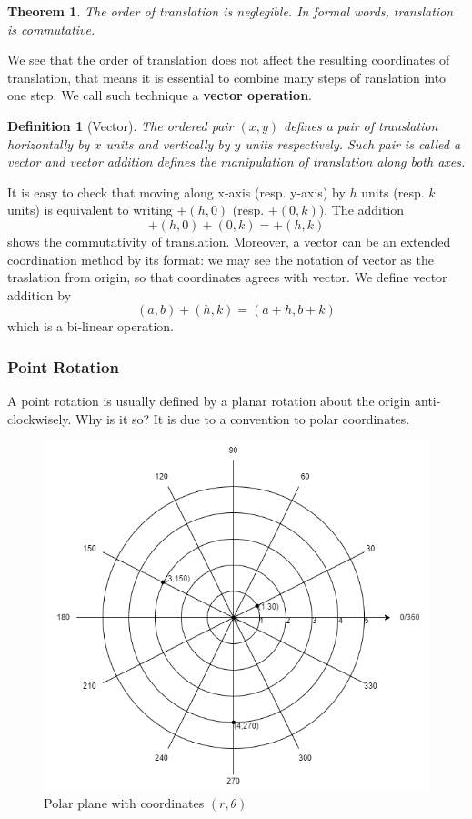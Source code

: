\documentclass[12pt]{article}
\newtheorem{definition}{Definition}[section]
\newtheorem*{theorem}{Theorem}
\begin{document}
    \begin{theorem}
        The order of translation is neglegible. In formal words, translation is commutative.
    \end{theorem}

    We see that the order of translation does not affect the resulting coordinates of translation, that means it is essential to combine many steps of ranslation into one step. We call such technique a \textbf{vector operation}.
    
    \begin{definition}[Vector]
        The ordered pair $(x,y)$ defines a pair of translation horizontally by $x$ units and vertically by $y$ units respectively. Such pair is called a vector and vector addition defines the manipulation of translation along both axes.
    \end{definition}

    It is easy to check that moving along x-axis (resp. y-axis) by $h$ units (resp. $k$ units) is equivalent to writing $+(h,0)$ (resp. $+(0,k)$). The addition \[+(h,0)+(0,k)=+(h,k)\] shows the commutativity of translation. Moreover, a vector can be an extended coordination method by its format: we may see the notation of vector as the traslation from origin, so that coordinates agrees with vector. We define vector addition by \[(a,b)+(h,k)=(a+h,b+k)\] which is a bi-linear operation.

    \subsubsection*{Point Rotation}

    A point rotation is usually defined by a planar rotation about the origin anti-clockwisely. Why is it so? It is due to a convention to polar coordinates.

    \begin{figure}[H]
        \centering
        \includegraphics[scale=0.8]{polar.png}
        \caption{Polar plane with coordinates $(r,\theta)$}
    \end{figure}
\end{document}
